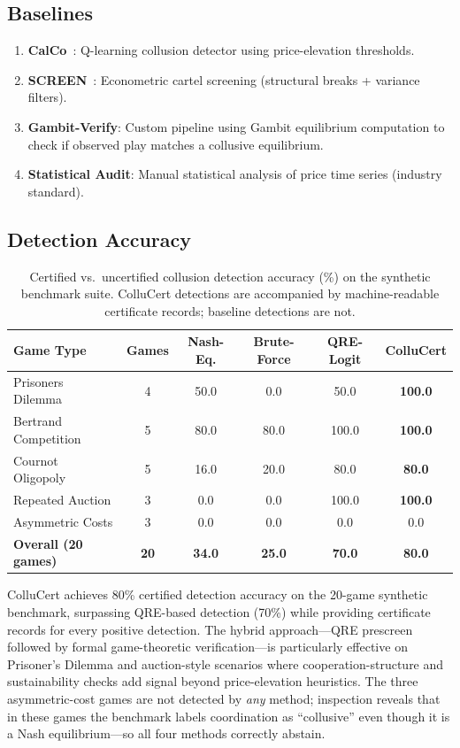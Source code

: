 \documentclass[11pt]{article}
\begin{document}
\subsection{Baselines}

\begin{enumerate}
\item \textbf{CalCo}~\cite{calvano2020}: Q-learning collusion detector using price-elevation thresholds.
\item \textbf{SCREEN}~\cite{screen}: Econometric cartel screening (structural breaks + variance filters).
\item \textbf{Gambit-Verify}: Custom pipeline using Gambit equilibrium computation to check if observed play matches a collusive equilibrium.
\item \textbf{Statistical Audit}: Manual statistical analysis of price time series (industry standard).
\end{enumerate}

\subsection{Detection Accuracy}

\begin{table}[t]
\centering
\caption{Certified vs.\ uncertified collusion detection accuracy (\%) on the synthetic benchmark suite. ColluCert detections are accompanied by machine-readable certificate records; baseline detections are not.}
\begin{tabular}{lccccc}
\toprule
\textbf{Game Type} & \textbf{Games} & \textbf{Nash-Eq.} & \textbf{Brute-Force} & \textbf{QRE-Logit} & \textbf{ColluCert} \\
\midrule
Prisoners Dilemma & 4 & 50.0 & 0.0 & 50.0 & \textbf{100.0} \\
Bertrand Competition & 5 & 80.0 & 80.0 & 100.0 & \textbf{100.0} \\
Cournot Oligopoly & 5 & 16.0 & 20.0 & 80.0 & \textbf{80.0} \\
Repeated Auction & 3 & 0.0 & 0.0 & 100.0 & \textbf{100.0} \\
Asymmetric Costs & 3 & 0.0 & 0.0 & 0.0 & 0.0 \\
\midrule
\textbf{Overall (20 games)} & \textbf{20} & \textbf{34.0} & \textbf{25.0} & \textbf{70.0} & \textbf{80.0} \\
\bottomrule
\end{tabular}
\end{table}

ColluCert achieves 80\% certified detection accuracy on the 20-game synthetic benchmark, surpassing QRE-based detection (70\%) while providing certificate records for every positive detection. The hybrid approach---QRE prescreen followed by formal game-theoretic verification---is particularly effective on Prisoner's Dilemma and auction-style scenarios where cooperation-structure and sustainability checks add signal beyond price-elevation heuristics. The three asymmetric-cost games are not detected by \emph{any} method; inspection reveals that in these games the benchmark labels coordination as ``collusive'' even though it is a Nash equilibrium---so all four methods correctly abstain.
\end{document}

